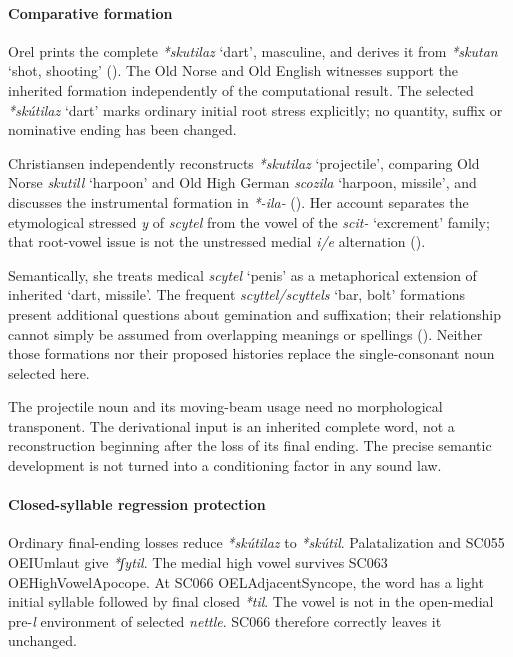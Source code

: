 \documentclass[
  british,
  a4paper,
]{article}
\providecommand{\Recon}[1]{\emph{*#1}}
\begin{document}
\paragraph{Comparative formation}\label{comparative-formation}

Orel prints the complete \Recon{skutilaz} `dart', masculine, and derives
it from \emph{*skutan} `shot, shooting' (). The Old Norse and Old English witnesses support the
inherited formation independently of the computational result. The
selected \Recon{skútilaz} `dart' marks ordinary initial root stress
explicitly; no quantity, suffix or nominative ending has been changed.

Christiansen independently reconstructs \emph{*skutilaz} `projectile',
comparing Old Norse \emph{skutill} `harpoon' and Old High German
\emph{scozila} `harpoon, missile', and discusses the instrumental
formation in \emph{*-ila-} (). Her account separates the etymological stressed
\emph{y} of \emph{scytel} from the vowel of the \emph{scit-} `excrement'
family; that root-vowel issue is not the unstressed medial \emph{i/e}
alternation ().

Semantically, she treats medical \emph{scytel} `penis' as a metaphorical
extension of inherited `dart, missile'. The frequent
\emph{scyttel/scyttels} `bar, bolt' formations present additional
questions about gemination and suffixation; their relationship cannot
simply be assumed from overlapping meanings or spellings
(). Neither
those formations nor their proposed histories replace the
single-consonant noun selected here.

The projectile noun and its moving-beam usage need no morphological
transponent. The derivational input is an inherited complete word, not a
reconstruction beginning after the loss of its final ending. The precise
semantic development is not turned into a conditioning factor in any
sound law.

\paragraph{Closed-syllable regression
protection}\label{closed-syllable-regression-protection}

Ordinary final-ending losses reduce \emph{*skútilaz} to \emph{*skútil}.
Palatalization and SC055 OEIUmlaut give \emph{*ʃytil}. The medial high
vowel survives SC063 OEHighVowelApocope. At SC066 OELAdjacentSyncope,
the word has a light initial syllable followed by final closed
\emph{*til}. The vowel is not in the open-medial pre-\emph{l}
environment of selected \emph{nettle}. SC066 therefore correctly leaves
it unchanged.
\end{document}
